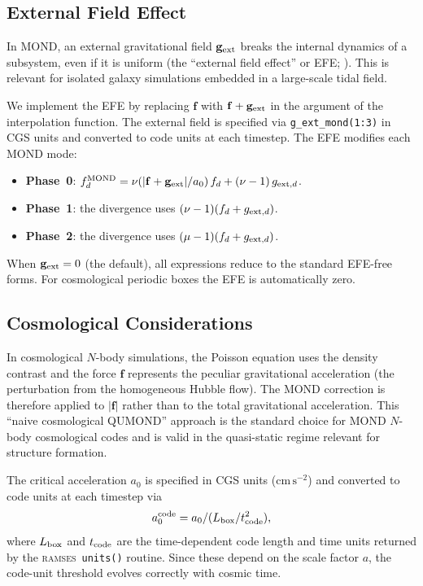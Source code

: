 \documentclass[fleqn,usenatbib]{mnras}
\newcommand{\ramses}{\textsc{ramses}}
\newcommand{\code}[1]{\texttt{#1}}
\newcommand{\azero}{a_0}
\begin{document}
\subsection{External Field Effect}
\label{sec:mond_efe}

In MOND, an external gravitational field $\mathbf{g}_{\rm ext}$
breaks the internal dynamics of a subsystem, even if it is
uniform (the ``external field effect'' or EFE;
\citealt{Milgrom1983,Bekenstein1984}).  This is relevant for
isolated galaxy simulations embedded in a large-scale tidal field.

We implement the EFE by replacing $\mathbf{f}$ with
$\mathbf{f} + \mathbf{g}_{\rm ext}$ in the argument of the
interpolation function.  The external field is specified via
\code{g\_ext\_mond(1:3)} in CGS units and converted to code
units at each timestep.  The EFE modifies each MOND mode:
\begin{itemize}
\item \textbf{Phase~0}: $f_d^{\rm MOND} = \nu(|\mathbf{f}+
  \mathbf{g}_{\rm ext}|/\azero)\,f_d + (\nu - 1)\,g_{{\rm ext},d}$.
\item \textbf{Phase~1}: the divergence uses $(\nu-1)
  (f_d + g_{{\rm ext},d})$.
\item \textbf{Phase~2}: the divergence uses $(\mu-1)
  (f_d + g_{{\rm ext},d})$.
\end{itemize}
When $\mathbf{g}_{\rm ext} = 0$ (the default), all expressions reduce
to the standard EFE-free forms.  For cosmological periodic boxes the
EFE is automatically zero.

\subsection{Cosmological Considerations}
\label{sec:mond_cosmo}

In cosmological $N$-body simulations, the Poisson equation uses the
density contrast and the force $\mathbf{f}$ represents the peculiar
gravitational acceleration (the perturbation from the homogeneous
Hubble flow).  The MOND correction is therefore applied to $|\mathbf{f}|$
rather than to the total gravitational acceleration.  This ``naive
cosmological QUMOND'' approach is the standard choice for MOND
$N$-body cosmological codes
\citep{Lughausen2015,Candlish2015,Nagesh2021} and is valid in the
quasi-static regime relevant for structure formation.

The critical acceleration $\azero$ is specified in CGS units
($\mathrm{cm\,s^{-2}}$) and converted to code units at each timestep
via
\begin{equation}
\azero^{\rm code} = \azero / (L_{\rm box}/t_{\rm code}^2),
\end{equation}
where $L_{\rm box}$ and $t_{\rm code}$ are the time-dependent code
length and time units returned by the \ramses\ \code{units()} routine.
Since these depend on the scale factor $a$, the code-unit threshold
evolves correctly with cosmic time.
\end{document}
